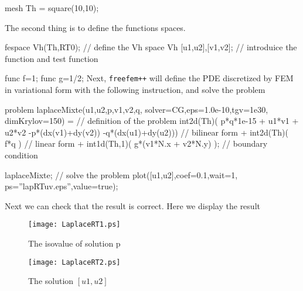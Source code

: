 \documentclass[twoside]{book}
\begin{document}
\bFF

mesh Th = square(10,10);
\eFF


The second thing is to define the functions spaces.

\bFF

fespace Vh(Th,RT0);  // define the Vh space
Vh [u1,u2],[v1,v2];  //  introduice the function and test function
\eFF

func f=1;
func g=1/2;
Next, \texttt{freefem++} will define
the PDE discretized by FEM in variational form with the following
instruction,  and solve the problem

\bFF

problem laplaceMixte(u1,u2,p,v1,v2,q,
solver=CG,eps=1.0e-10,tgv=1e30,
dimKrylov=150) =  
// definition of the problem
int2d(Th)( p*q*1e-15 + u1*v1 + u2*v2 
-p*(dx(v1)+dy(v2)) 
-q*(dx(u1)+dy(u2)))     //  bilinear form
+ int2d(Th)( f*q )                    //  linear form
+ int1d(Th,1)( g*(v1*N.x + v2*N.y) );  // boundary condition

laplaceMixte;  // solve the problem
plot([u1,u2],coef=0.1,wait=1,
     ps=''lapRTuv.eps'',value=true);
\eFF
 
Next we can check that the result is correct.
Here we display the result 
\begin{figure}[htbp]
	\begin{center}
		\texttt{[image: LaplaceRT1.ps]}
	\end{center}
	\caption{The isovalue of solution p}
\end{figure}

\begin{figure}[htbp]
	\begin{center}
		\texttt{[image: LaplaceRT2.ps]}
	\end{center}
	\caption{The solution $[u1,u2]$}
\end{figure}
\end{document}
